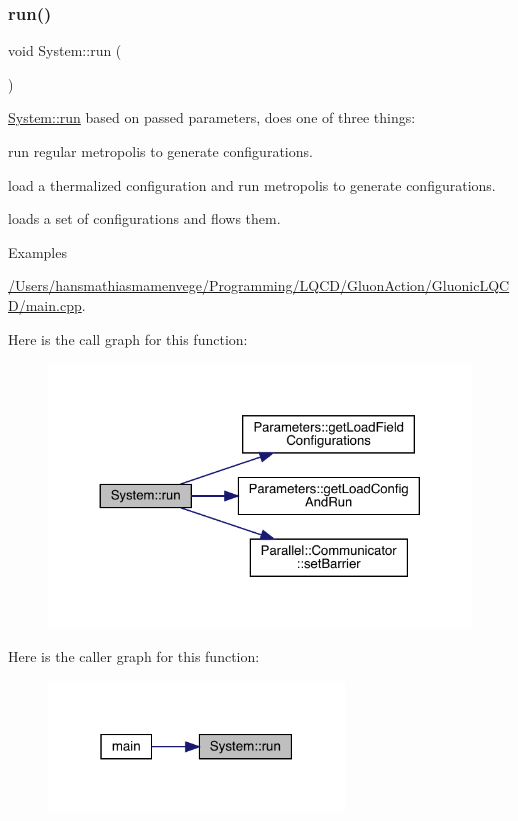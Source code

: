 \subsubsection{\texorpdfstring{run()}{run()}}
{\footnotesize\ttfamily void System\+::run (\begin{DoxyParamCaption}{ }\end{DoxyParamCaption})}



\mbox{\hyperlink{class_system_afa39feb75f96798930f4bfb48205f40b}{System\+::run}} based on passed parameters, does one of three things\+: 


\begin{DoxyItemize}
\item run regular metropolis to generate configurations.
\item load a thermalized configuration and run metropolis to generate configurations.
\item loads a set of configurations and flows them. 
\end{DoxyItemize}\begin{Desc}
\item[Examples]\par
\mbox{\hyperlink{_2_users_2hansmathiasmamenvege_2_programming_2_l_q_c_d_2_gluon_action_2_gluonic_l_q_c_d_2main_8cpp-example}{/\+Users/hansmathiasmamenvege/\+Programming/\+L\+Q\+C\+D/\+Gluon\+Action/\+Gluonic\+L\+Q\+C\+D/main.\+cpp}}.\end{Desc}
Here is the call graph for this function\+:
\nopagebreak
\begin{figure}[H]
\begin{center}
\leavevmode
\includegraphics[width=324pt]{class_system_afa39feb75f96798930f4bfb48205f40b_cgraph}
\end{center}
\end{figure}
Here is the caller graph for this function\+:
\nopagebreak
\begin{figure}[H]
\begin{center}
\leavevmode
\includegraphics[width=223pt]{class_system_afa39feb75f96798930f4bfb48205f40b_icgraph}
\end{center}
\end{figure}


